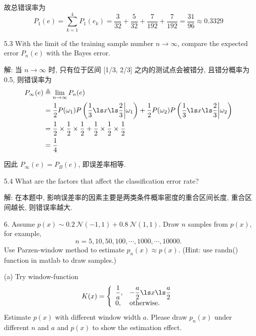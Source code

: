 \documentclass[openany]{ctexbook}
\theoremstyle{kaiti}
\theoremstyle{normal}
\begin{document}
故总错误率为
\begin{equation}
  P_1(e)=\sum_{k=1}^4P_1(e_k)=\frac{3}{32}+\frac{5}{32}+\frac{7}{192}+\frac{7}{192}=\frac{31}{96}\approx0.3329
\end{equation}

5.3 With the limit of the training sample number $n \rightarrow \infty$, compare the expected error $P_{n}(e)$ with the Bayes error.

解: 当 $n\to\infty$ 时, 只有位于区间 [1/3, 2/3] 之内的测试点会被错分, 且错分概率为 0.5, 则错误率为
\begin{equation}
  \begin{aligned}
    P_\infty(e)
    &\triangleq\lim_{n\to\infty}P_n(e)\\
    &=\frac{1}{2}P(\omega_1)P\left(\frac{1}{3}\ls x\ls\frac{2}{3}\bigg|\omega_1\right)+\frac{1}{2}P(\omega_2)P\left(\frac{1}{3}\ls x\ls\frac{2}{3}\bigg|\omega_2\right)\\
    &=\frac{1}{2}\times\frac{1}{2}\times\frac{1}{2}+\frac{1}{2}\times\frac{1}{2}\times\frac{1}{2}\\
    &=\frac{1}{4}\\
  \end{aligned}
\end{equation}

因此 $P_\infty(e)=P_B(e)$, 即误差率相等.

5.4 What are the factors that affect the classification error rate?

解: 在本题中, 影响误差率的因素主要是两类条件概率密度的重合区间长度, 重合区间越长, 则错误率越大.

6. Assume  $p(x) \sim 0.2~\mathcal{N}(-1,1)+0.8~\mathcal{N}(1,1)$.  Draw $n$ samples from $p(x)$, for example, 
\begin{equation}
  n=5,10,50,100,\cdots,1000,\cdots,10000.
\end{equation} 
Use Parzen-window method to estimate $p_n(x)\approx p(x)$. (Hint: use randn() function in matlab to draw samples.)

(a) Try window-function 
\begin{equation}
  K(x)=
  \left\{
    \begin{array}{ll}
      \dfrac{1}{a},&-\dfrac{a}{2}\ls x\ls \dfrac{a}{2} \\
      0, & \text{otherwise.}
    \end{array}
  \right.
\end{equation} 
Estimate $p(x)$ with different window width $a$. Please draw $p_n(x)$ under different $n$ and $a$ and $p(x)$ to show the estimation effect.
\end{document}
